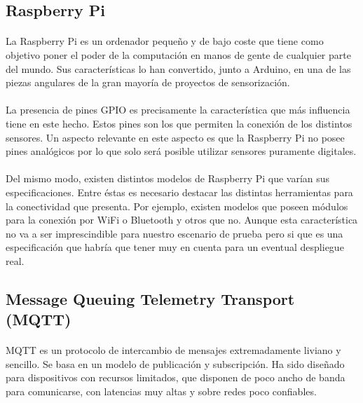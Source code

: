 \documentclass[12pt, a4paper]{article}
\begin{document}
        \subsection{Raspberry Pi}
        
        \paragraph{}
        La Raspberry Pi es un ordenador pequeño y de bajo coste que tiene como objetivo poner el poder de la computación en manos de gente de cualquier parte del mundo. Sus características lo han convertido, junto a Arduino, en una de las piezas angulares de la gran mayoría de proyectos de sensorización.

        \paragraph{}
        La presencia de pines GPIO es precisamente la característica que más influencia tiene en este hecho. Estos pines son los que permiten la conexión de los distintos sensores. Un aspecto relevante en este aspecto es que la Raspberry Pi no posee pines analógicos por lo que solo será posible utilizar sensores puramente digitales.

        \paragraph{}
        Del mismo modo, existen distintos modelos de Raspberry Pi que varían sus especificaciones. Entre éstas es necesario destacar las distintas herramientas para la conectividad que presenta. Por ejemplo, existen modelos que poseen módulos para la conexión por WiFi o Bluetooth y otros que no. Aunque esta característica no va a ser imprescindible para nuestro escenario de prueba pero si que es una especificación que habría que tener muy en cuenta para un eventual despliegue real.

        \subsection{Message Queuing Telemetry Transport (MQTT)}
        
        \paragraph{}
        MQTT es un protocolo de intercambio de mensajes extremadamente liviano y sencillo. Se basa en un modelo de publicación y subscripción. Ha sido diseñado para dispositivos con recursos limitados, que disponen de poco ancho de banda para comunicarse, con latencias muy altas y sobre redes poco confiables.
\end{document}
